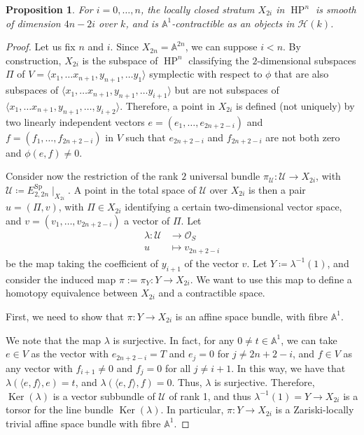 \documentclass[10pt]{amsart}
\theoremstyle{definition}
\theoremstyle{plain}
\newtheorem{prop}[defn]{Proposition}
\numberwithin{equation}{section}
\newcommand{\0}{\emptyset}
\newcommand{\sH}{{\mathcal H}}
\newcommand{\A}{{\mathbb A}}
\newcommand{\Sp}{{\operatorname{Sp}}}
\newcommand{\HP}{{\operatorname{HP}}}
\newcommand{\Ker}{{\operatorname{Ker}}}
\begin{document}
\begin{prop}
\label{prop:contractibleopencellofHPn}
    For $i=0, \ldots, n$, the locally closed stratum $X_{2i}$ in $\HP^n$ is smooth of dimension $4n-2i$ over $k$, and is $\mathbb{A}^1$-contractible as an objects in $\sH(k)$.  
\end{prop}

\begin{proof}
    Let us fix $n$ and $i$. Since $X_{2n}=\mathbb{A}^{2n}$, we can suppose $i<n$. By construction, $X_{2i}$ is the subspace of $\HP^n$ classifying the $2$-dimensional subspaces $\Pi$ of $V=\langle x_1, \ldots x_{n+1},y_{n+1}, \ldots y_1 \rangle$ symplectic with respect to $\phi$ that are also subspaces of $\langle x_1, \ldots x_{n+1},y_{n+1}, \ldots y_{i+1} \rangle$ but are not subspaces of $\langle x_1, \ldots x_{n+1}, y_{n+1}, \ldots, y_{i+2}\rangle$. Therefore, a point in $X_{2i}$ is defined (not uniquely) by two linearly independent vectors $e=(e_1, \ldots, e_{2n+2-i})$ and $f=(f_1, \ldots, f_{2n+2-i})$ in $V$ such that $e_{2n+2-i}$ and $f_{2n+2-i}$ are not both zero and $\phi(e,f)\neq 0$.

    Consider now the restriction of the rank $2$ universal bundle $\pi_{\mathcal{U}}: \mathcal{U} \to X_{2i}$, with $\mathcal{U}\coloneqq E_{2,2n}^\Sp \mid_{X_{2i}}$. A point in the total space of $\mathcal{U}$ over $X_{2i}$ is then a pair $u=(\Pi,v)$, with $\Pi \in X_{2i}$ identifying a certain two-dimensional vector space, and $v=(v_1,\ldots, v_{2n+2-i})$ a vector of $\Pi$. Let 
\begin{align*}
    \lambda : \mathcal{U} & \to \mathcal{O}_S \\
    u & \mapsto v_{2n+2-i}
\end{align*}
be the map taking the coefficient of $y_{i+1}$ of the vector $v$. Let $Y \coloneqq \lambda^{-1}(1)$, and consider the induced map $\pi :=\pi_Y: Y \to X_{2i}$. We want to use this map to define a homotopy equivalence between $X_{2i}$ and a contractible space.

First, we need to show that $\pi: Y \to X_{2i}$ is an affine space bundle, with fibre $\A^1$.

We note that the map $\lambda$ is surjective. In fact, for any $0\neq t \in \A^1$, we can take $e \in V$ as the vector with $e_{2n+2-i}=T$ and $e_j=0$ for $j \neq 2n+2-i$, and $f \in V$ as any vector with $f_{i+1} \neq 0$ and $f_j=0$ for all $j \neq i+1$. In this way, we have that $\lambda(\langle e,f \rangle,e)=t$, and $\lambda (\langle e,f \rangle,f)=0$. Thus, $\lambda$ is surjective. Therefore, $\Ker(\lambda)$ is a vector subbundle of $\mathcal{U}$ of rank 1, and thus $\lambda^{-1}(1)=Y \to X_{2i}$ is a torsor for the line bundle $\Ker(\lambda)$. In particular, $\pi:Y \to X_{2i}$ is a Zariski-locally trivial affine space bundle with fibre $\A^1$.


\end{proof}
\end{document}

